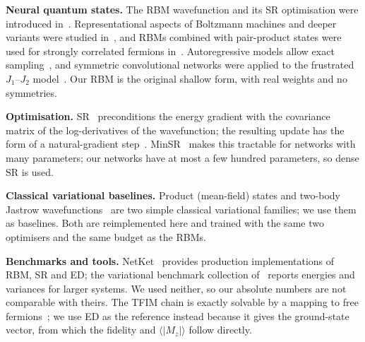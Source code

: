 \textbf{Neural quantum states.} The RBM wavefunction and its SR optimisation were introduced in~\cite{carleo2016solving}. Representational aspects of Boltzmann machines and deeper variants were studied in~\cite{gao2017efficient}, and RBMs combined with pair-product states were used for strongly correlated fermions in~\cite{nomura2017restricted}. Autoregressive models allow exact sampling~\cite{sharir2019deep,hibatallah2020recurrent}, and symmetric convolutional networks were applied to the frustrated $J_1$--$J_2$ model~\cite{choo2019study}. Our RBM is the original shallow form, with real weights and no symmetries.

\textbf{Optimisation.} SR~\cite{sorella1998green} preconditions the energy gradient with the covariance matrix of the log-derivatives of the wavefunction; the resulting update has the form of a natural-gradient step~\cite{amari1998natural}. MinSR~\cite{chen2023empowering} makes this tractable for networks with many parameters; our networks have at most a few hundred parameters, so dense SR is used.

\textbf{Classical variational baselines.} Product (mean-field) states and two-body Jastrow wavefunctions~\cite{jastrow1955many} are two simple classical variational families; we use them as baselines. Both are reimplemented here and trained with the same two optimisers and the same budget as the RBMs.

\textbf{Benchmarks and tools.} NetKet~\cite{vicentini2021netket} provides production implementations of RBM, SR and ED; the variational benchmark collection of~\cite{wu2023variational} reports energies and variances for larger systems. We used neither, so our absolute numbers are not comparable with theirs. The TFIM chain is exactly solvable by a mapping to free fermions~\cite{pfeuty1970one}; we use ED as the reference instead because it gives the ground-state vector, from which the fidelity and $\langle|M_z|\rangle$ follow directly.
